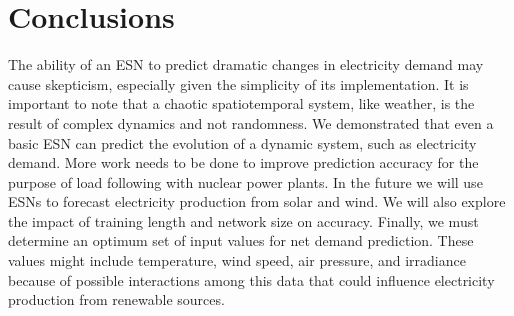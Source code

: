 \section{Conclusions}

The ability of an \gls{ESN} to predict dramatic changes in electricity demand
may cause skepticism, especially given the simplicity of its implementation.
It is important to note that a chaotic spatiotemporal system, like weather, is
the result of complex dynamics and not randomness. We demonstrated that even a
basic \gls{ESN} can predict the evolution of a dynamic system, such as
electricity demand.
More work needs to be done to improve prediction accuracy for the purpose of
load following with nuclear power plants. In the future we will use \glspl{ESN}
to forecast electricity production from solar and wind. We will also explore the
impact of training length and network size on accuracy. Finally, we must
determine an optimum set of input values for net demand prediction. These values
might include temperature, wind speed, air pressure, and irradiance because of
possible interactions among this data that could influence electricity
production from renewable sources.
